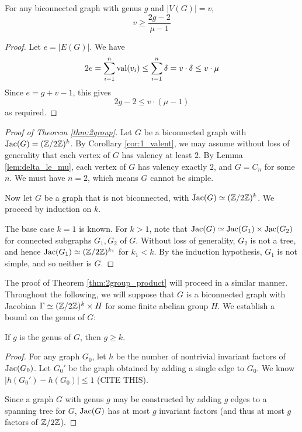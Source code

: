 \documentclass{amsart}
\begin{document}
\begin{cor}
  \label{cor:genus_v_mu}
  For any biconnected graph with genus $g$ and $|V(G)| = v$,
  \begin{equation*}
    v \ge \frac{2g - 2}{\mu - 1}
  \end{equation*}
\end{cor}
\begin{proof}
  Let $e = |E(G)|$. We have 
  \begin{equation}
    2e = \sum_{i=1}^n \operatorname{val}(v_i) \le \sum_{i=1}^n \delta = v \cdot \delta
    \le v \cdot \mu
  \end{equation}
  Since $e = g + v - 1$, this gives
  \begin{equation}
    2g - 2 \le v \cdot (\mu - 1)
  \end{equation}
  as required.

\end{proof}

\begin{proof}[Proof of Theorem \ref{thm:2group}]
  Let $G$ be a biconnected graph with $\operatorname{Jac}(G) = (\mathbb{Z}/2\mathbb{Z})^k$. By
  Corollary \ref{cor:1_valent}, we may assume without loss of
  generality that each vertex of $G$ has valency at least $2$. By
  Lemma \ref{lem:delta_le_mu}, each vertex of $G$ has valency exactly
  $2$, and $G = C_n$ for some $n$. We must have $n=2$, which means $G$
  cannot be simple.

  Now let $G$ be a graph that is not biconnected, with $\operatorname{Jac}(G) \simeq
  (\mathbb{Z}/2\mathbb{Z})^k$. We proceed by induction on $k$.
  
  The base case $k=1$ is known. For $k > 1$, note that $\operatorname{Jac}(G) \simeq
  \operatorname{Jac}(G_1) \times \operatorname{Jac}(G_2)$ for connected subgraphs $G_1, G_2$ of
  $G$. Without loss of generality, $G_2$ is not a tree, and
  hence $\operatorname{Jac}(G_1) \simeq (\mathbb{Z}/2\mathbb{Z})^{k_1}$ for $k_1 < k$. By the
  induction hypothesis, $G_1$ is not simple, and so neither is $G$.
\end{proof}

The proof of Theorem \ref{thm:2group_product} will proceed in a
similar manner. Throughout the following, we will suppose that $G$ is
a biconnected graph with Jacobian $\Gamma \simeq (\mathbb{Z}/2\mathbb{Z})^k \times H$
for some finite abelian group $H$. We establish a bound on the
genus of $G$:

\begin{lem}
  \label{lem:genus_cycle}
  If $g$ is the genus of $G$, then $g \ge k$.
\end{lem}
\begin{proof}
  For any graph $G_0$, let $h$ be the number of nontrivial invariant
  factors of $\operatorname{Jac}(G_0)$. Let $G_0'$ be the graph obtained by adding a
  single edge to $G_0$. We know $|h(G_0') - h(G_0)| \le 1$ (CITE
  THIS). 

  Since a graph $G$ with genus $g$ may be constructed by adding $g$ edges
  to a spanning tree for $G$, $\operatorname{Jac}(G)$ has at most $g$ invariant
  factors (and thus at most $g$ factors of $\mathbb{Z}/2\mathbb{Z}$). 
\end{proof}
\end{document}
